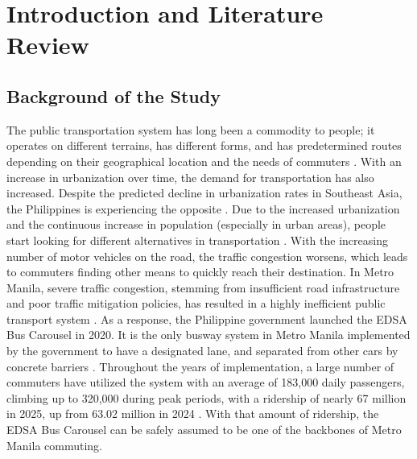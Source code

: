 \chapter{Introduction and Literature Review}


\section{Background of the Study}
The public transportation system has long been a commodity to people; it operates on different terrains, has different forms, and has predetermined routes depending on their geographical location and the needs of commuters \cite{Tironi2018}. With an increase in urbanization over time, the demand for transportation has also increased. Despite the predicted decline in urbanization rates in Southeast Asia, the Philippines is experiencing the opposite \cite{UN_WUP2018}. Due to the increased urbanization and the continuous increase in population (especially in urban areas), people start looking for different alternatives in transportation \cite{Cervero2000}. With the increasing number of motor vehicles on the road, the traffic congestion worsens, which leads to commuters finding other means to quickly reach their destination. In Metro Manila, severe traffic congestion, stemming from insufficient road infrastructure and poor traffic mitigation policies, has resulted in a highly inefficient public transport system \cite{Spatio2026}. As a response, the Philippine government launched the EDSA Bus Carousel in 2020. It is the only busway system in Metro Manila implemented by the government to have a designated lane, and separated from other cars by concrete barriers \cite{Chua2026}. Throughout the years of implementation, a large number of commuters have utilized the system with an average of 183,000 daily passengers, climbing up to 320,000 during peak periods, with a ridership of nearly 67 million in 2025, up from 63.02 million in 2024 \cite{DOTr2025Ridership}. With that amount of ridership, the EDSA Bus Carousel can be safely assumed to be one of the backbones of Metro Manila commuting.


